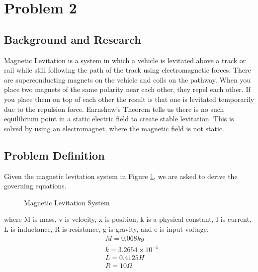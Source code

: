 \documentclass{article}
\begin{document}
    \section{Problem 2}
    \subsection{Background and Research}
    Magnetic Levitation is a system in which a vehicle is levitated above a track or rail while still following the path of the track using electromagnetic forces. There are superconducting magnets on the vehicle and coils on the pathway.
    When you place two magnets of the same polarity near each other, they repel each other. If you place them on top of each other the result is that one is levitated temporarily due to the repulsion force.
    Earnshaw's Theorem tells us there is no such equilibrium point in a static electric field to create stable levitation. This is solved by using an electromagnet, where the magnetic field is not static.

    \subsection{Problem Definition}
    Given the magnetic levitation system in Figure \ref{fig:CircuitDiagram}, we are asked to derive the governing equations.
    \begin{figure}[ht]
        \makebox[0pt]{}
        \caption{Magnetic Levitation System}
        \label{fig:CircuitDiagram}
    \end{figure}
    where  M is mass, v is velocity, x is position, k is a physical constant, I is current,
    L is inductance, R is resistance, g is gravity, and e is input voltage.
    \begin{equation}\nonumber
        \begin{aligned}
            &M=0.068 kg\\
            &k=3.2654\times10^{-5}\\
            &L=0.4125 H\\
            &R=10 \Omega
        \end{aligned}
    \end{equation}
\end{document}
